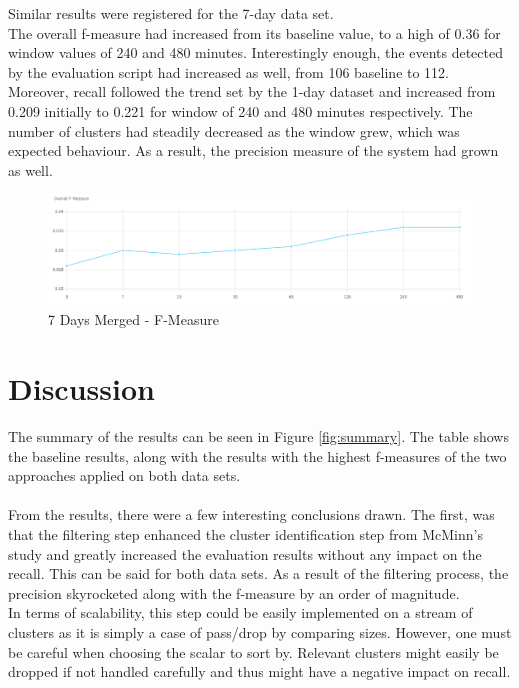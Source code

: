 \documentclass[a4paper,portrait,12pt]{article}
\begin{document}
\begin{enumerate}
		  Similar results were registered for the 7-day data set. \\
		  The overall f-measure had increased from its baseline value, to a high of 0.36 for window values of 240 and 480 minutes.
		  Interestingly enough, the events detected by the evaluation script had increased as well, from 106 baseline to 112.
		  \\
		  Moreover, recall followed the trend set by the 1-day dataset and increased from 0.209 initially to 0.221 for window of 240 and 480 minutes respectively. 
		  The number of clusters had steadily decreased as the window grew, which was expected behaviour.
		  As a result, the precision measure of the system had grown as well.
	      \begin{figure}[h!]
		      \centering
		      \includegraphics[width=\linewidth]{images/7days-merged-f-measure.png}
		      \caption{7 Days Merged - F-Measure}
		      \label{fig:7days-merged-f-measure}
	      \end{figure}
\end{enumerate}

\section{Discussion}
\label{section-discussion}

The summary of the results can be seen in Figure \ref{fig:summary}.
The table shows the baseline results, along with the results with the highest f-measures of the two approaches applied on both data sets.\\
\\
From the results, there were a few interesting conclusions drawn. 
The first, was that the filtering step enhanced the cluster identification step from McMinn's study \cite{McMinn2013} and greatly increased the evaluation results without any impact on the recall.
This can be said for both data sets.
As a result of the filtering process, the precision skyrocketed along with the f-measure by an order of magnitude. \\
In terms of scalability, this step could be easily implemented on a stream of clusters as it is simply a case of pass/drop by comparing sizes.
However, one must be careful when choosing the scalar to sort by.
Relevant clusters might easily be dropped if not handled carefully and thus might have a negative impact on recall.
\end{document}
